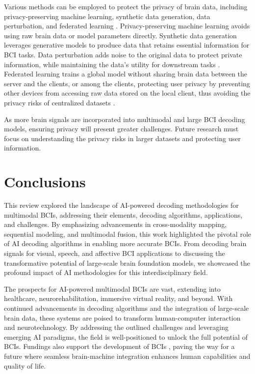 \documentclass[journal]{IEEEtran}
\begin{document}
Various methods can be employed to protect the privacy of brain data, including privacy-preserving machine learning, synthetic data generation, data perturbation, and federated learning \cite{Chen2024UWP, Xia2023}. Privacy-preserving machine learning avoids using raw brain data or model parameters directly. Synthetic data generation leverages generative models to produce data that retains essential information for BCI tasks. Data perturbation adds noise to the original data to protect private information, while maintaining the data's utility for downstream tasks \cite{Chen2024UWP}. Federated learning trains a global model without sharing brain data between the server and the clients, or among the clients, protecting user privacy by preventing other devices from accessing raw data stored on the local client, thus avoiding the privacy risks of centralized datasets \cite{Jia2024, Liu2024a}.

As more brain signals are incorporated into multimodal and large BCI decoding models, ensuring privacy will present greater challenges. Future research must focus on understanding the privacy risks in larger datasets and protecting user information.

\section{Conclusions} \label{sect:conclusions}

This review explored the landscape of AI-powered decoding methodologies for multimodal BCIs, addressing their elements, decoding algorithms, applications, and challenges. By emphasizing advancements in cross-modality mapping, sequential modeling, and multimodal fusion, this work highlighted the pivotal role of AI decoding algorithms in enabling more accurate BCIs. From decoding brain signals for visual, speech, and affective BCI applications to discussing the transformative potential of large-scale brain foundation models, we showcased the profound impact of AI methodologies for this interdisciplinary field.

The prospects for AI-powered multimodal BCIs are vast, extending into healthcare, neurorehabilitation, immersive virtual reality, and beyond. With continued advancements in decoding algorithms and the integration of large-scale brain data, these systems are poised to transform human-computer interaction and neurotechnology. By addressing the outlined challenges and leveraging emerging AI paradigms, the field is well-positioned to unlock the full potential of BCIs. Fundings also support the development of BCIs \cite{Wang2017, Miller2024BRAINInit}, paving the way for a future where seamless brain-machine integration enhances human capabilities and quality of life.

 
\end{document}
